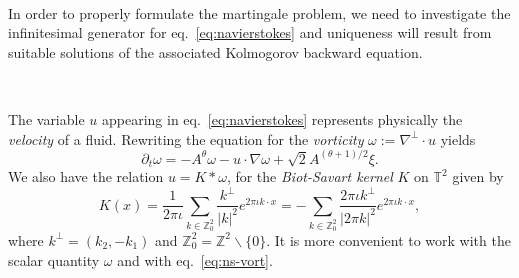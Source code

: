 \documentclass[10pt]{article}
\newcommand{\assign}{:=}
\newcommand{\nobracket}{}
\newcommand{\tmem}[1]{{\em #1\/}}
\newcommand{\tmtextit}[1]{{\itshape{#1}}}
\begin{document}
\

In order to properly formulate the martingale problem, we need to investigate
the infinitesimal generator for eq.~{\eqref{eq:navierstokes}} and uniqueness
will result from suitable solutions of the associated Kolmogorov backward
equation.

\

The variable $u$ appearing in eq.~{\eqref{eq:navierstokes}} represents
physically the {\tmem{velocity}} of a fluid. Rewriting the equation for the
\tmtextit{vorticity} $\omega \assign \nabla^{\perp} \cdot u$ yields
\begin{equation}
  \partial_t \omega = - A^{\theta} \omega - u \cdot \nabla \omega + \sqrt{2}
  A^{(\theta + 1) / 2} \xi . \label{eq:ns-vort}
\end{equation}
We also have the relation $u = K \ast \omega$, for the {\tmem{Biot-Savart
kernel}} $K$ on $\mathbb{T}^2$ given by
\[ K (x) = \frac{1}{2 \pi \iota}  \sum_{k \in \mathbb{Z}_0^2}
   \frac{k^{\perp}}{| k |^2 \nobracket \nobracket} e^{2 \pi \iota k \cdot x} =
   - \sum_{k \in \mathbb{Z}_0^2} \frac{2 \pi \iota k^{\perp}}{| 2 \pi k |^2
   \nobracket \nobracket} e^{2 \pi \iota k \cdot x}, \]
where $k^{\perp} = (k_2, - k_1)$ and $\mathbb{Z}_0^2 =\mathbb{Z}^2 \backslash
\{ 0 \}$. It is more convenient to work with the scalar quantity $\omega$ and
with eq.~{\eqref{eq:ns-vort}}.

\
\end{document}
